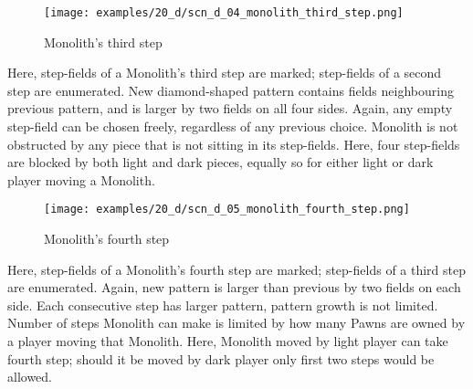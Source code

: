 \clearpage %

\vspace*{-2.1\baselineskip}
\noindent
\begin{figure}[!h]
\texttt{[image: examples/20\_d/scn\_d\_04\_monolith\_third\_step.png]}
\vspace*{-1.3\baselineskip}
\caption{Monolith's third step}
\label{fig:scn_d_04_monolith_third_step}
\end{figure}

\vspace*{-0.5\baselineskip}
Here, step-fields of a Monolith's third step are marked; step-fields of a second
step are enumerated. New diamond-shaped pattern contains fields neighbouring
previous pattern, and is larger by two fields on all four sides. \newline
\indent
Again, any empty step-field can be chosen freely, regardless of any previous choice.
Monolith is not obstructed by any piece that is not sitting in its step-fields.
Here, four step-fields are blocked by both light and dark pieces, equally so for
either light or dark player moving a Monolith.

\clearpage %

\vspace*{-2.1\baselineskip}
\noindent
\begin{figure}[!h]
\texttt{[image: examples/20\_d/scn\_d\_05\_monolith\_fourth\_step.png]}
\vspace*{-1.3\baselineskip}
\caption{Monolith's fourth step}
\label{fig:scn_d_05_monolith_fourth_step}
\end{figure}

\vspace*{-0.5\baselineskip}
Here, step-fields of a Monolith's fourth step are marked; step-fields of a third step
are enumerated. Again, new pattern is larger than previous by two fields on each side.
Each consecutive step has larger pattern, pattern growth is not limited. \newline
\indent
Number of steps Monolith can make is limited by how many Pawns are owned by a player
moving that Monolith. Here, Monolith moved by light player can take fourth step;
should it be moved by dark player only first two steps would be allowed.

\clearpage %

